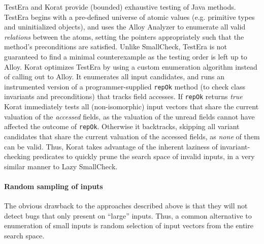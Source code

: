 TestEra \cite{khurshid_testera:_2004,marinov_testera:_2001} and Korat
\cite{boyapati_korat:_2002} provide (bounded) exhaustive testing of Java
methods.
%
TestEra begins
with a pre-defined universe of atomic values (e.g. primitive types and
uninitialized objects), and uses the Alloy Analyzer
\cite{jackson_alcoa:_2000} to enumerate all valid \emph{relations}
between the atoms, \ie setting the pointers appropriately such that the
method's preconditions are satisfied.
%
%
Unlike SmallCheck, TestEra is not guaranteed to find a minimal
counterexample as the testing order is left up to Alloy.
%
Korat optimizes TestEra by using a custom enumeration algorithm instead
of calling out to Alloy.
%
It enumerates all input candidates, and runs an instrumented version of
a programmer-supplied \texttt{repOk} method (to check class invariants
and preconditions) that tracks field accesses.
%
If \texttt{repOk} returns \emph{true} Korat immediately tests all
(non-isomorphic) input vectors that share the current valuation of the
\emph{accessed} fields, as the valuation of the unread fields cannot
have affected the outcome of \texttt{repOk}.
%
Otherwise it backtracks, skipping all variant candidates that share
the current valuation of the accessed fields, as \emph{none} of them can
be valid.
%
Thus, Korat takes advantage of the inherent laziness of
invariant-checking predicates to quickly prune the search space of
invalid inputs, in a very similar manner to Lazy SmallCheck.

\paragraph{Random sampling of inputs}
The obvious drawback to the approaches described above is that they will
not detect bugs that only present on ``large'' inputs.
%
Thus, a common alternative to enumeration of small inputs is random
selection of input vectors from the entire search space.

